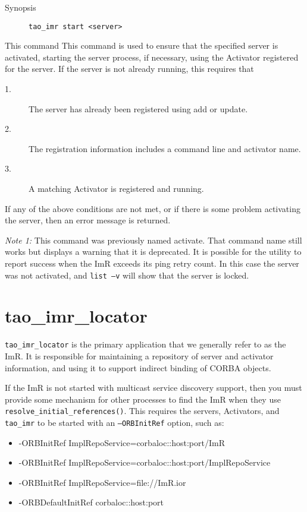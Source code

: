 \begin{description}
    \item [Synopsis] {\tt tao\_imr start <server>}
\end{description}

This command This command is used to ensure that the specified server
is activated, starting the server process, if necessary, using the Activator
 registered for the server. If the server is not already running, this requires
that

\begin{description}
\item[1.] The server has already been registered using add or update.
\item[2.] The registration information includes a command line and activator name.
\item[3.] A matching Activator is registered and running.
\end{description}

If any of the above conditions are not met, or if there is some problem activating the server,
then an error message is returned.

\emph {Note 1:}  This command was previously named activate.  That command name still
works but displays a warning that it is deprecated.  It is possible for the utility to report
success when the ImR exceeds its ping retry count. In this case the server was not activated,
and {\tt list –v} will show that the server is locked.

\section{tao\_imr\_locator}
\label{tao\_imr\_locator}

{\tt tao\_imr\_locator} is the primary application that we generally refer to as the ImR. It is responsible
for maintaining a repository of server and activator information, and using it to support indirect binding
of CORBA objects.

If the ImR is not started with multicast service discovery support, then you must provide some
mechanism for other processes to find the ImR when they use {\tt resolve\_initial\_references()}.
This requires the servers,  Activators, and {\tt tao\_imr} to be started with an {\tt –ORBInitRef}
option, such as:

\small{
\begin{itemize}
\item -ORBInitRef ImplRepoService=corbaloc::host:port/ImR
\item -ORBInitRef ImplRepoService=corbaloc::host:port/ImplRepoService
\item -ORBInitRef ImplRepoService=file://ImR.ior
\item -ORBDefaultInitRef corbaloc::host:port
\end{itemize}
}

